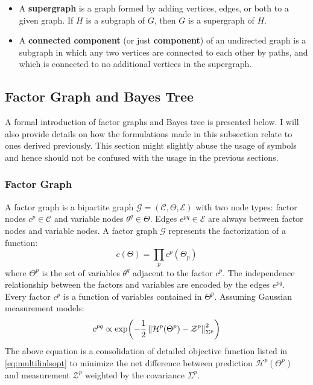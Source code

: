 \begin{itemize}
\item A \textbf{supergraph} is a graph formed by adding vertices, edges, or both to a given graph. If $H$ is a subgraph of $G$, then $G$ is a supergraph of $H$.
\item A \textbf{connected component} (or just \textbf{component}) of an undirected graph is a subgraph in which any two vertices are connected to each other by paths, and which is connected to no additional vertices in the supergraph.
\end{itemize}

\subsection{Factor Graph and Bayes Tree}
A formal introduction of factor graphs \cite{factorgraph} and Bayes tree \cite{kaessbayestree} is presented below. I will also provide details on how the formulations made in this subsection relate to ones derived previously. This section might slightly abuse the usage of symbols and hence should not be confused with the usage in the previous sections.

\subsubsection{Factor Graph}
A factor graph is a bipartite graph $\mathcal{G} = (\mathcal{C}, \Theta, \mathcal{E})$ with two node types: factor nodes $c^p \in \mathcal{C}$ and variable nodes $\theta^q \in \Theta$. Edges $e^{pq} \in \mathcal{E}$ are always between factor nodes and variable nodes. A factor graph $\mathcal{G}$ represents the factorization of a function: 
\begin{equation}
c(\Theta) = \prod_p c^p(\Theta_p)
\end{equation}
where $\Theta^p$ is the set of variables $\theta^q$ adjacent to the factor $c^p$. The independence relationship between the factors and variables are encoded by the edges $e^{pq}$. Every factor $c^p$ is a function of variables contained in $\Theta^p$. Assuming Gaussian measurement models:
\begin{equation}
c^{pq} \propto \text{exp}\biggl( -\frac{1}{2} \left\lVert\mathcal{H}^p(\Theta^p)-\mathcal{Z}^p\right\rVert^2_{\Sigma^p} \biggr)
\end{equation}
The above equation is a consolidation of detailed objective function listed in \ref{eq:multilinlsopt} to minimize the net difference between prediction $\mathcal{H}^p(\Theta^p)$ and measurement $\mathcal{Z}^p$ weighted by the covariance $\Sigma^p$. 

